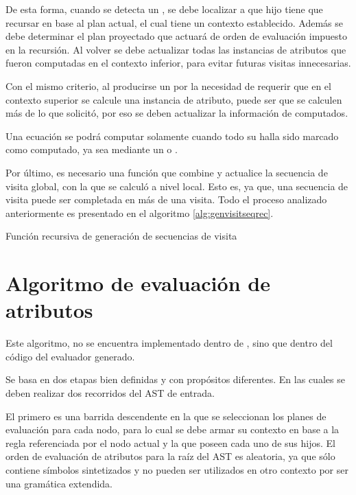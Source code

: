 De esta forma, cuando se detecta un , se debe localizar a que hijo tiene que recursar en base al plan actual, el cual tiene un contexto establecido. Además se debe determinar el plan proyectado que actuará de orden de evaluación impuesto en la recursión. Al volver se debe actualizar todas las instancias de atributos que fueron computadas en el contexto inferior, para evitar futuras visitas innecesarias.

Con el mismo criterio, al producirse un  por la necesidad de requerir que en el contexto superior se calcule una instancia de atributo, puede ser que se calculen más de lo que solicitó, por eso se deben actualizar la información de computados.

Una ecuación se podrá computar solamente cuando todo su  halla sido marcado como computado, ya sea mediante un  o .

Por último, es necesario una función que combine y actualice la secuencia de visita global, con la que se calculó a nivel local. Esto es, ya que, una secuencia de visita puede ser completada en más de una visita. Todo el proceso analizado anteriormente es presentado en el algoritmo \ref{alg:genvisitseqrec}.

\begin{algorithm}[!ht]

\caption{\label{alg:genvisitseqrec} Función recursiva de generación de secuencias de visita}
\end{algorithm}

\section{Algoritmo de evaluación de atributos}
\label{sec:algevalattr}

Este algoritmo, no se encuentra implementado dentro de \maggen, sino que dentro del código del evaluador generado.

Se basa en dos etapas bien definidas y con propósitos diferentes. En las cuales se deben realizar dos recorridos del AST de entrada.

El primero es una barrida descendente en la que se seleccionan los planes de evaluación para cada nodo, para lo cual se debe armar su contexto en base a la regla referenciada por el nodo actual y la que poseen cada uno de sus hijos. El orden de evaluación de atributos para la raíz del AST es aleatoria, ya que sólo contiene símbolos sintetizados y no pueden ser utilizados en otro contexto por ser una gramática extendida.

